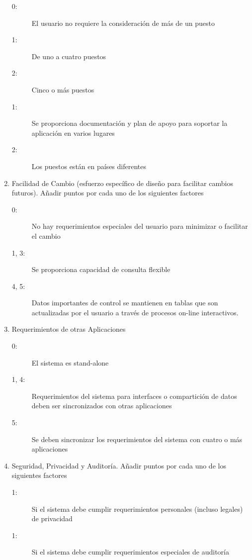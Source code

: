 \begin{enumerate}
                \begin{description}
                   \item[0:]El usuario no requiere la consideración de más de un puesto
                   \item[1:]De uno a cuatro puestos
                   \item[2:]Cinco o más puestos
                   \item[1:]Se proporciona documentación y plan de apoyo para soportar la aplicación en varios lugares
                   \item[2:]Los puestos están en países diferentes
                \end{description}
            \item Facilidad de Cambio (esfuerzo específico de diseño para facilitar cambios futuros). Añadir puntos por cada uno de los siguientes factores
                \begin{description}
                   \item[0:]No hay requerimientos especiales del usuario para minimizar o facilitar el cambio
                   \item[1, 3:]Se proporciona capacidad de consulta flexible
                   \item[4, 5:]Datos importantes de control se mantienen en tablas que son actualizadas por el usuario a través de procesos on-line interactivos.
                \end{description}
            \item Requerimientos de otras Aplicaciones
                \begin{description}
                   \item[0:]El sistema es stand-alone
                   \item[1, 4:]Requerimientos del sistema para interfaces o compartición de datos deben ser sincronizados con otras aplicaciones
                   \item[5:]Se deben sincronizar los requerimientos del sistema con cuatro o más aplicaciones
                \end{description}
            \item Seguridad, Privacidad y Auditoría. Añadir puntos por cada uno de los siguientes factores
                \begin{description}
                   \item[1:]Si el sistema debe cumplir requerimientos personales (incluso legales) de privacidad
                   \item[1:]Si el sistema debe cumplir requerimientos especiales de auditoría

\end{description}
\end{enumerate}
